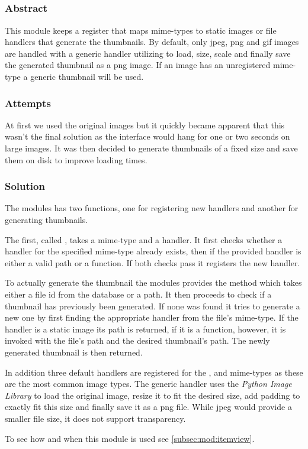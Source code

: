 \subsection{}
\label{sub:mod:thumbnail}
\def\kapitelautor{Clemens Stadlbauer}

\subsubsection{Abstract}

This module keeps a register that maps mime-types to static images or file
handlers that generate the thumbnails. By default, only jpeg, png and gif
images are handled with a generic handler utilizing  to
load, size, scale and finally save the generated thumbnail as a png image. If
an image has an unregistered mime-type a generic thumbnail will be used.

\subsubsection{Attempts}

At first we used the original images but it quickly became apparent that this
wasn't the final solution as the interface would hang for one or two seconds on
large images. It was then decided to generate thumbnails of a fixed size and
save them on disk to improve loading times.

\subsubsection{Solution} %

The modules has two functions, one for registering new handlers and another for
generating thumbnails.

The first, called , takes a mime-type and a handler. It first
checks whether a handler for the specified mime-type already exists, then if
the provided handler is either a valid path or a function. If both checks pass
it registers the new handler.

To actually generate the thumbnail the modules provides the
 method which takes either a file id from the database or
a path. It then proceeds to check if a thumbnail has previously been generated.
If none was found it tries to generate a new one by first finding the
appropriate handler from the file's mime-type. If the handler is a static image
its path is returned, if it is a function, however, it is invoked with the
file's path and the desired thumbnail's path. The newly generated thumbnail is
then returned.

In addition three default handlers are registered for the ,
 and  mime-types as these are the most
common image types. The generic handler uses the \emph{Python Image
Library} to load the original image, resize it to fit the desired
size, add padding to exactly fit this size and finally save it as a png file.
While jpeg would provide a smaller file size, it does not support transparency.

To see how and when this module is used see \cref{subsec:mod:itemview}.
